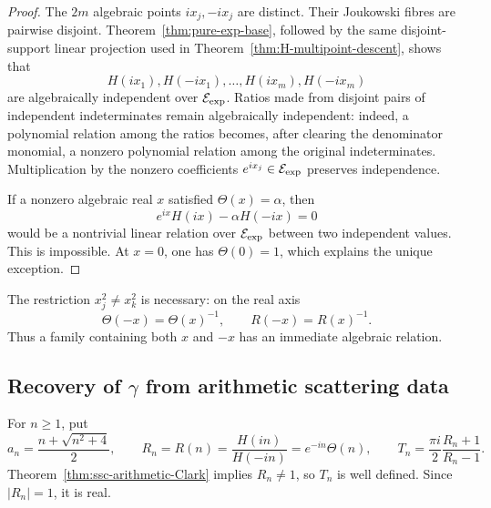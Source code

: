 \begin{proof}
The \(2m\) algebraic points \(ix_j,-ix_j\) are distinct.  Their Joukowski
fibres are pairwise disjoint.  Theorem~\ref{thm:pure-exp-base}, followed by
the same disjoint-support linear projection used in
Theorem~\ref{thm:H-multipoint-descent}, shows that
\[
 H(ix_1),H(-ix_1),\ldots,H(ix_m),H(-ix_m)
\]
are algebraically independent over \(\mathcal E_{\mathrm{exp}}\).  Ratios made from disjoint
pairs of independent indeterminates remain algebraically independent:
indeed, a polynomial relation among the ratios becomes, after clearing
the denominator monomial, a nonzero polynomial relation among the original
indeterminates.  Multiplication by the nonzero coefficients
\(e^{ix_j}\in\mathcal E_{\mathrm{exp}}\) preserves independence.

If a nonzero algebraic real \(x\) satisfied \(\Theta(x)=\alpha\), then
\[
 e^{ix}H(ix)-\alpha H(-ix)=0
\]
would be a nontrivial linear relation over \(\mathcal E_{\mathrm{exp}}\) between two
independent values.  This is impossible.  At \(x=0\), one has
\(\Theta(0)=1\), which explains the unique exception.
\end{proof}

\begin{remark}
The restriction \(x_j^2\ne x_k^2\) is necessary: on the real axis
\[
 \Theta(-x)=\Theta(x)^{-1},\qquad R(-x)=R(x)^{-1}.
\]
Thus a family containing both \(x\) and \(-x\) has an immediate algebraic
relation.
\end{remark}

\subsection{Recovery of \texorpdfstring{$\gamma$}{gamma} from arithmetic
scattering data}

For \(n\geq1\), put
\begin{equation}\label{eq:ssc-an-Rn-Tn}
 a_n=\frac{n+\sqrt{n^2+4}}2,\qquad
 R_n=R(n)=\frac{H(in)}{H(-in)}=e^{-in}\Theta(n),\qquad
 T_n=\frac{\pi i}{2}\frac{R_n+1}{R_n-1}.
\end{equation}
Theorem~\ref{thm:ssc-arithmetic-Clark} implies \(R_n\ne1\), so \(T_n\)
is well defined.  Since \(|R_n|=1\), it is real.


